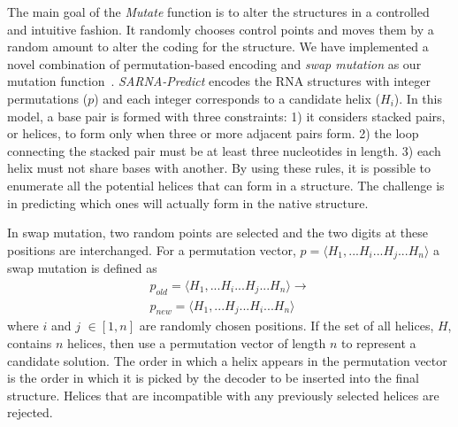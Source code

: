 \documentclass{doublecol-new}
\theoremstyle{TH}{
\newtheorem{lemma}{Lemma}
\newtheorem{theorem}[lemma]{Theorem}
\newtheorem{corrolary}[lemma]{Corrolary}
\newtheorem{conjecture}[lemma]{Conjecture}
\newtheorem{proposition}[lemma]{Proposition}
\newtheorem{claim}[lemma]{Claim}
\newtheorem{stheorem}[lemma]{Wrong Theorem}
\newtheorem{algorithm}{Algorithm}
}
\theoremstyle{THrm}{
\newtheorem{definition}{Definition}
\newtheorem{question}{Question}
\newtheorem{remark}{Remark}
\newtheorem{scheme}{Scheme}
}
\theoremstyle{THhit}{
\newtheorem{case}{Case}[section]
}
\begin{document}
The main goal of the {\em Mutate} function is
to alter the structures in
a controlled and intuitive fashion. It randomly chooses control points and moves
them by a random amount to alter the coding for the structure.
We have implemented a novel combination of permutation-based encoding
and {\em swap mutation} as our mutation function~\cite{Eiben_2003}.
{\em SARNA-Predict} encodes the RNA structures with integer permutations ($p$) and
each integer corresponds to a candidate helix ($H_i$).
In this model, a base pair is formed with 
three constraints: 1) it considers
stacked pairs, or helices, to form only when three or more adjacent
pairs form. 2) the loop connecting the stacked pair must be at
least three nucleotides in length. 3) each helix must not share bases with another. 
By using these rules, it is possible to enumerate all the
potential helices that can form in a structure. The challenge is in
predicting which ones will actually form in the native structure.

In swap mutation, two random points are selected and the two digits at these
positions are interchanged. For a permutation vector,
$p = \langle H_1,...H_i...H_j...H_n\rangle $
a swap mutation is defined as
\begin{equation}
\begin{multlined}
p_{old} = \langle H_1,...H_i...H_j...H_n\rangle \rightarrow  \\
p_{new} = \langle H_1,...H_j...H_i...H_n\rangle
\end{multlined}
\end{equation}
\noindent where $i$ and $j$ $\in [1,n]$ are randomly chosen positions.
If the set of all helices, $H$,
contains $n$ helices, then use a permutation vector of length $n$ to represent a candidate solution.
The order in which a helix appears in the permutation vector is the order in which it is picked by the
decoder to be inserted into the final structure. Helices that are incompatible with any
previously selected helices are rejected.
\end{document}
